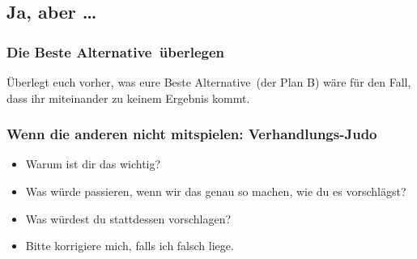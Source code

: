 \subsection{Ja, aber \ldots}


\subsubsection{Die \glqq Beste Alternative\grqq\ überlegen}

Überlegt euch vorher, was eure \glqq Beste Alternative\grqq\ (der \glqq Plan B\grqq) wäre für den Fall, dass ihr miteinander zu keinem Ergebnis kommt.


\subsubsection{Wenn die anderen nicht mitspielen: Verhandlungs-Judo}

\begin{itemize}
  \item Warum ist dir das wichtig?
  \item Was würde passieren, wenn wir das genau so machen, wie du es vorschlägst?
  \item Was würdest du stattdessen vorschlagen?
  \item Bitte korrigiere mich, falls ich falsch liege.
\end{itemize}
